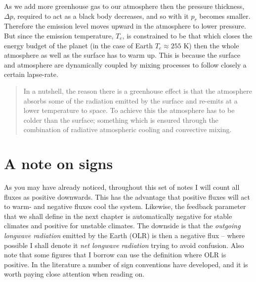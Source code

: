 \documentclass[12pt]{book}
\begin{document}
As we add more greenhouse gas to our atmosphere then the pressure thickness, $\Delta p$, required to act as a black body decreases, and so with it $p_r$ becomes smaller. Therefore the emission level moves upward in the atmosphere to lower pressure. But since the emission temperature, $T_e$, is constrained to be that which closes the energy budget of the planet (in the case of Earth $T_e \approx 255$ K) then the whole atmosphere as well as the surface has to warm up. This is because the surface and atmosphere are dynamically coupled by mixing processes to follow closely a certain lapse-rate.

\blockquote{In a nutshell, the reason there is a greenhouse effect is that the atmosphere absorbs some of the radiation emitted by the surface and re-emits at a lower temperature to space. To achieve this the atmosphere has to be colder than the surface; something which is ensured through the combination of radiative atmospheric cooling and convective mixing.}



\section{A note on signs}
As you may have already noticed, throughout this set of notes I will count all fluxes as positive downwards. This has the advantage that positive fluxes will act to warm- and negative fluxes cool the system. Likewise, the feedback parameter that we shall define in the next chapter is automatically negative for stable climates and positive for unstable climates. The downside is that the {\em outgoing longwave radiation} emitted by the Earth (OLR) is then a negative flux -- where possible I shall denote it {\em net longwave radiation} trying to avoid confusion. Also note that some figures that I borrow can use the definition where OLR is positive. In the literature a number of sign conventions have developed, and it is worth paying close attention when reading on.
\end{document}
